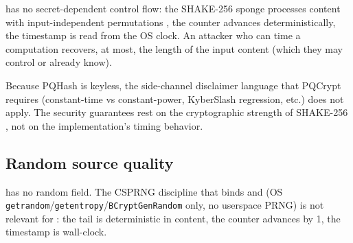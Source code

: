 \pqhash{} has no secret-dependent control flow: the SHAKE-256 sponge processes content with input-independent permutations \citep{fips202}, the counter advances deterministically, the timestamp is read from the OS clock. An attacker who can time a \pqhash{} computation recovers, at most, the length of the input content (which they may control or already know).

Because PQHash is keyless, the side-channel disclaimer language that PQCrypt requires (constant-time vs constant-power, KyberSlash regression, etc.) does not apply. The security guarantees rest on the cryptographic strength of SHAKE-256 \citep{fips202}, not on the implementation's timing behavior.

\subsection{Random source quality}

\pqhash{} has no random field. The CSPRNG discipline that binds \pqid{} and \pqcrypt{} (OS \texttt{getrandom}/\texttt{getentropy}/\texttt{BCryptGenRandom} only, no userspace PRNG) is not relevant for \pqhash{}: the tail is deterministic in content, the counter advances by 1, the timestamp is wall-clock.
